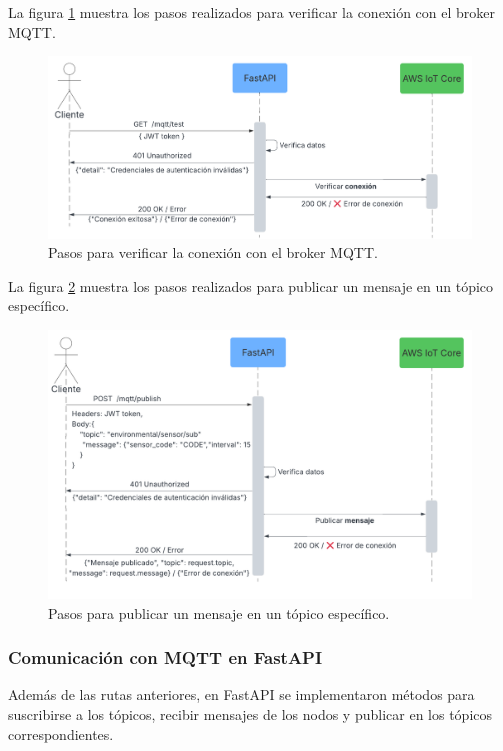 La figura \ref{fig:test_mqtt} muestra los pasos realizados para verificar la
conexión con el broker MQTT.

\begin{figure}[H]
    \centering
    \includegraphics[width=.90\textwidth]{./Images/20.png}
    \caption{Pasos para verificar la conexión con el broker MQTT.}
    \label{fig:test_mqtt}
\end{figure}

La figura \ref{fig:publish_mqtt} muestra los pasos realizados para publicar un
mensaje en un tópico específico.

\begin{figure}[H]
    \centering
    \includegraphics[width=.90\textwidth]{./Images/21.png}
    \caption{Pasos para publicar un mensaje en un tópico específico.}
    \label{fig:publish_mqtt}
\end{figure}

\subsubsection{Comunicación con MQTT en FastAPI}

Además de las rutas anteriores, en FastAPI se implementaron métodos para
suscribirse a los tópicos, recibir mensajes de los nodos y publicar en los
tópicos correspondientes.

